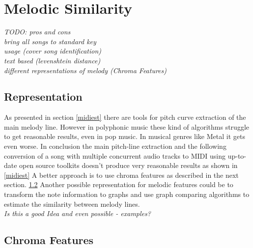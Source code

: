 
\chapter{Melodic Similarity}\label{melsimc}

\cite{chroma1} \cite{chroma2}
\textit{TODO: 
pros and cons\\
bring all songs to standard key \\
usage (cover song identification)\\
text based (levenshtein distance)\\
different representations of melody (Chroma Features)\\}

\section{Representation}

As presented in section \ref{midiest} there are tools for pitch curve extraction of the main melody line. However in polyphonic music these kind of algorithms struggle to get reasonable results, even in pop music. In musical genres like Metal it gets even worse. In conclusion the main pitch-line extraction and the following conversion of a song with multiple concurrent audio tracks to MIDI using up-to-date open source toolkits doesn't produce very reasonable results as shown in \ref{midiest}
A better approach is to use chroma features as described in the next section. \ref{chromafeat}
Another possible representation for melodic features could be to transform the note information to graphs and use graph comparing algorithms to estimate the similarity between melody lines. 
\ \\
\textit{Is this a good Idea and even possible - examples?}

\section{Chroma Features}\label{chromafeat}


